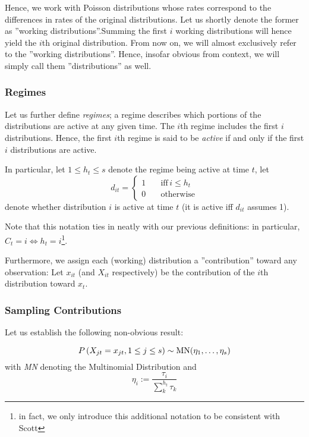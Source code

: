 		Hence, we work with Poisson distributions whose rates correspond to the differences in rates of the original distributions. Let us shortly denote the former as ''working distributions''.Summing the first $i$ working distributions will hence yield the $i$th original distribution. 
		From now on, we will almost exclusively refer to the ''working distributions''. Hence, insofar obvious from context, we will simply call them ''distributions'' as well.
		
		\subsubsection*{Regimes}
		
			
			Let us further define \textit{regimes}; a regime describes which portions of the distributions are active at any given time. The $i$th regime includes the first $i$ distributions. Hence, the first $i$th regime is said to be \textit{active} if and only if the first $i$ distributions are active. 

			
			In particular, let $1 \leq h_t \leq s$  denote the regime being active at time $t$, let 
			\[
				d_{it} = \begin{cases}
					1 &\quad \text{iff} \, i \leq h_t\\
					0 &\quad \text{otherwise}
				\end{cases}
			\]
			denote whether distribution $i$ is active at time $t$ (it is active iff $d_{it}$ assumes 1).
			
			Note that this notation ties in neatly with our previous definitions: in particular, $C_t = i \iff h_t = i$\footnote{in fact, we only introduce this additional notation to be consistent with Scott}. 
			
			Furthermore, we assign each (working) distribution a ''contribution'' toward any observation: Let $x_{it}$ (and $X_{it}$ respectively) be the contribution of the $i$th distribution toward $x_t$. 
			
			
		\subsubsection{Sampling Contributions}
			Let us establish the following non-obvious result:
		
			\begin{lemma}
				\[P \left(X_{jt} = x_{jt}, 1 \leq j \leq s\right) \sim \text{MN}(\eta_1, \dots, \eta_s) 
				\]
				with \textit{MN} denoting the Multinomial Distribution and
				\[
					\eta_i := \frac{\tau_i}{\sum_k^{h_t} \tau_k}
				\]
			\end{lemma}
		
